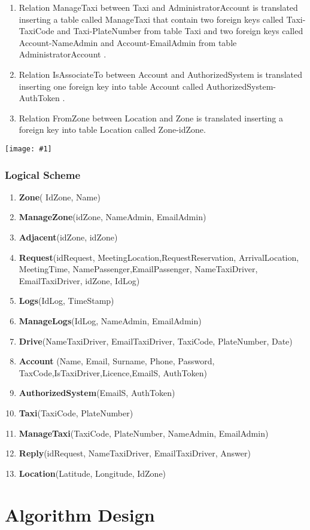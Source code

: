 \documentclass[11pt, a4paper,titlepage]{article}
\newcommand{\image}[1]{
	\begin{center}
		\noindent \texttt{[image: \#1]}
	\end{center}
	}
\begin{document}
\begin{enumerate}
	\item  Relation ManageTaxi between Taxi and AdministratorAccount  is translated inserting a table called ManageTaxi that contain two foreign keys called Taxi-TaxiCode and Taxi-PlateNumber from table Taxi and two foreign keys called Account-NameAdmin and Account-EmailAdmin from table AdministratorAccount .
	\item  Relation IsAssociateTo between Account  and AuthorizedSystem is translated inserting one foreign key into table Account called AuthorizedSystem-AuthToken .
	\item  Relation FromZone between Location and Zone is translated inserting a foreign key into table Location called Zone-idZone.
	
\end{enumerate}
\image{schema_database.png}
\subsubsection{Logical Scheme}
\begin{enumerate}
	\item \textbf{Zone}( IdZone, Name)
	\item \textbf{ManageZone}(idZone, NameAdmin, EmailAdmin)
	\item \textbf{Adjacent}(idZone, idZone)
	\item \textbf{Request}(idRequest, MeetingLocation,RequestReservation, ArrivalLocation, MeetingTime, NamePassenger,EmailPassenger, NameTaxiDriver, EmailTaxiDriver, idZone, IdLog)
	\item \textbf{Logs}(IdLog, TimeStamp)
	\item \textbf{ManageLogs}(IdLog, NameAdmin, EmailAdmin)
	\item \textbf{Drive}(NameTaxiDriver, EmailTaxiDriver, TaxiCode, PlateNumber, Date)
	\item \textbf{Account} (Name, Email, Surname, Phone, Password, TaxCode,IsTaxiDriver,Licence,EmailS, AuthToken)
	\item \textbf{AuthorizedSystem}(EmailS, AuthToken)
	\item \textbf{Taxi}(TaxiCode, PlateNumber)
	\item \textbf{ManageTaxi}(TaxiCode, PlateNumber, NameAdmin, EmailAdmin)
	\item \textbf{Reply}(idRequest, NameTaxiDriver, EmailTaxiDriver, Answer)
	\item \textbf{Location}(Latitude, Longitude, IdZone)
\end{enumerate}
\section{Algorithm Design}
\end{document}
